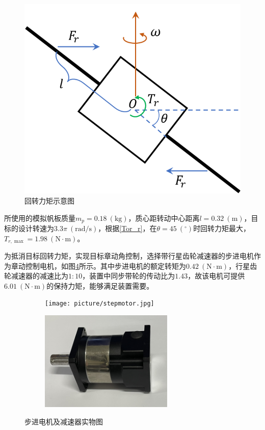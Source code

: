 \documentclass[lang=chs, degree=master, blindreview=false, winfonts=true]{yanputhesis}
\begin{document}
\begin{figure}[htbp]
	\centering
	\includegraphics[width = 2.5 in]{picture/huizhuan_tor_pic.png}
	\caption{回转力矩示意图}
	\label{fig:huizhuan_tor}
\end{figure}
所使用的模拟帆板质量$m_{p}=0.18\ (\mathrm{kg})$，质心距转动中心距离$l=0.32\ (\mathrm{m})$，目标的设计转速为$3.3\pi\ (\mathrm{rad/s})$，根据\autoref{Tor_r}，在$\theta=45\ (\mathrm{^\circ})$时回转力矩最大，$T_{r,\max}=1.98\ (\mathrm{N \cdot m})$。

为抵消目标回转力矩，实现目标章动角控制，选择带行星齿轮减速器的步进电机作为章动控制电机，如图\ref{Fig.stepmotor_reducer}所示。其中步进电机的额定转矩为$0.42\ (\mathrm{N \cdot m})$，行星齿轮减速器的减速比为$1:10$，装置中同步带轮的传动比为$1.43$，故该电机可提供$6.01\ (\mathrm{N \cdot m})$的保持力矩，能够满足装置需要。
\begin{figure}[htbp]
	\centering
	\begin{minipage}[t]{0.96\textwidth}
		\begin{subfigure}[t]{0.47\textwidth}
			\centering
			\texttt{[image: picture/stepmotor.jpg]}
			\caption{ }
			\label{fig:stepmotor}
		\end{subfigure}\hfill
		\begin{subfigure}[t]{0.47\textwidth}
			\centering
			\includegraphics[width = 2.5in]{picture/reducer2.jpg}
			\caption{ }
			\label{fig:reducer}
		\end{subfigure}
	\end{minipage}
	\caption{步进电机及减速器实物图\label{Fig.stepmotor_reducer}}
\end{figure}
\end{document}
